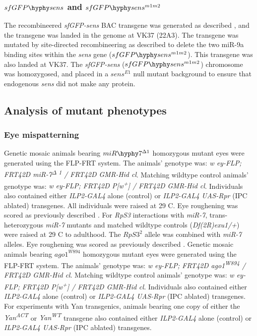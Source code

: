 \subsubsection{$sfGFP\hyphy sens$ and $sfGFP\hyphy sens^{m1m2}$}
\label{appendix:supp:metabolism:exp:sfgfp_sens}

The recombineered \textit{sfGFP-sens} BAC transgene was generated as described \cite{Cassidy2013}, and the transgene was landed in the genome at VK37 (22A3). The transgene was mutated by site-directed recombineering as described \cite{Cassidy2013} to delete the two miR-9a binding sites within the \textit{sens} gene ($sfGFP\hyphy sens^{m1m2}$). This transgene was also landed at VK37. The \textit{sfGFP-sens} ($sfGFP\hyphy sens^{m1m2}$) chromosome was homozygosed, and placed in a $sens^{E1}$ null mutant background to ensure that endogenous \textit{sens} did not make any protein.

\subsection{Analysis of mutant phenotypes}
\label{appendix:supp:metabolism:exp:phenotypes}

\subsubsection{Eye mispatterning}

Genetic mosaic animals bearing $miR\hyphy 7^{\Delta 1}$ homozygous mutant eyes were generated using the FLP-FRT system. The animals' genotype was: \textit{w ey-FLP; FRT42D miR-7\textsuperscript{$\Delta$ 1} / FRT42D GMR-Hid cl}. Matching wildtype control animals' genotype was: \textit{w ey-FLP; FRT42D P{[}w\textsuperscript{+}{]} / FRT42D GMR-Hid cl}. Individuals also contained either \textit{ILP2-GAL4} alone (control) or \textit{ILP2-GAL4 UAS-Rpr} (IPC ablated) transgenes. All individuals were raised at 29 \textdegree{}C. Eye roughening was scored as previously described \cite{Li2009b}. For \textit{RpS3} interactions with \textit{miR-7}, trans-heterozygous \textit{miR-7} mutants and matched wildtype controls (\textit{Df(2R)exu1/+}) were raised at 29 \textdegree{}C to adulthood. The $RpS3^2$ allele was combined with \textit{miR-7} alleles. Eye roughening was scored as previously described \cite{Li2009b}. Genetic mosaic animals bearing $ago1^{W894}$ homozygous mutant eyes were generated using the FLP-FRT system. The animals' genotype was: \textit{w ey-FLP; FRT42D ago1\textsuperscript{W894} / FRT42D GMR-Hid cl}. Matching wildtype control animals' genotype was: \textit{w ey-FLP; FRT42D P{[}w\textsuperscript{+}{]} / FRT42D GMR-Hid cl}. Individuals also contained either \textit{ILP2-GAL4} alone (control) or \textit{ILP2-GAL4 UAS-Rpr} (IPC ablated) transgenes. For experiments with Yan transgenics, animals bearing one copy of either the \textit{Yan\textsuperscript{ACT}} or \textit{Yan\textsuperscript{WT}} \cite{Rebay1995} transgene also contained either \textit{ILP2-GAL4} alone (control) or \textit{ILP2-GAL4 UAS-Rpr} (IPC ablated) transgenes.

